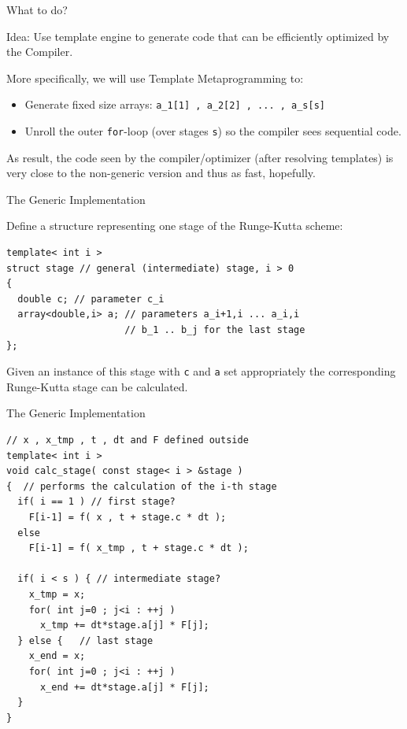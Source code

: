 \documentclass{beamer}
\begin{document}
\begin{frame}{What to do?}

\begin{block}{Idea:}
 Use template engine to generate code that can be efficiently optimized by the Compiler.
\end{block}

\vspace{1em}
\pause
More specifically, we will use Template Metaprogramming to:
\begin{itemize}
 \item Generate fixed size arrays: \lstinline+a_1[1] , a_2[2] , ... , a_s[s]+
 \item Unroll the outer \lstinline+for+-loop (over stages \lstinline+s+) so the compiler sees sequential code.
\end{itemize}

As result, the code seen by the compiler/optimizer (after resolving templates) is very close to the non-generic version and thus as fast, hopefully.
\end{frame}

\begin{frame}[fragile]{The Generic Implementation}

Define a structure representing one stage of the Runge-Kutta scheme:

\begin{lstlisting}
template< int i >
struct stage // general (intermediate) stage, i > 0
{
  double c; // parameter c_i
  array<double,i> a; // parameters a_i+1,i ... a_i,i
                     // b_1 .. b_j for the last stage
};
\end{lstlisting}

Given an instance of this stage with \lstinline+c+ and \lstinline+a+ set appropriately the corresponding Runge-Kutta stage can be calculated. 

\end{frame}


\begin{frame}[fragile]{The Generic Implementation}
\begin{lstlisting}
// x , x_tmp , t , dt and F defined outside
template< int i >
void calc_stage( const stage< i > &stage )
{  // performs the calculation of the i-th stage
  if( i == 1 ) // first stage?
    F[i-1] = f( x , t + stage.c * dt );
  else
    F[i-1] = f( x_tmp , t + stage.c * dt );

  if( i < s ) { // intermediate stage?
    x_tmp = x;
    for( int j=0 ; j<i : ++j )
      x_tmp += dt*stage.a[j] * F[j];
  } else {   // last stage
    x_end = x;
    for( int j=0 ; j<i : ++j )
      x_end += dt*stage.a[j] * F[j];
  }
}
\end{lstlisting}
\end{frame}
\end{document}
